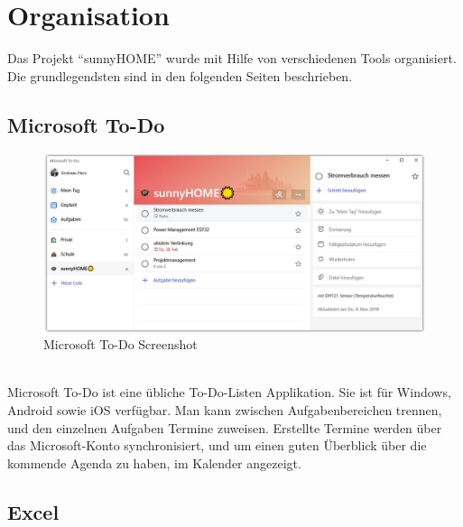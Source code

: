     
    

\pagebreak

\section{Organisation}
Das Projekt ``sunnyHOME'' wurde mit Hilfe von verschiedenen Tools organisiert. Die grundlegendsten sind in den folgenden Seiten beschrieben.

    \subsection{Microsoft To-Do}

        \begin{figure}[H]
            \centering
            \includegraphics[width=1\textwidth]{./media/images/TO-DO.png}
            \caption{Microsoft To-Do Screenshot}
            \label{fig:ToDo}
        \end{figure}
        
        \ \\ Microsoft To-Do ist eine übliche To-Do-Listen Applikation. Sie ist für Windows, Android sowie iOS verfügbar. Man kann zwischen Aufgabenbereichen trennen, und den einzelnen Aufgaben Termine zuweisen. Erstellte Termine werden über das Microsoft-Konto synchronisiert, und um einen guten Überblick über die kommende Agenda zu haben, im Kalender angezeigt.

\pagebreak
        
    \subsection{Excel}\label{ref:Protokoll}
    
